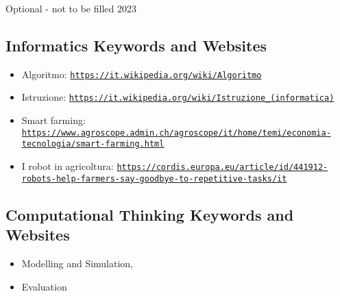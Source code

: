 \documentclass[a4paper,11pt]{report}
\newcommand{\BrochureUrlText}[1]{\texttt{#1}}
\begin{document}
Optional - not to be filled 2023


\subsection*{Informatics Keywords and Websites}

\begin{itemize}
  \item Algoritmo: \href{https://it.wikipedia.org/wiki/Algoritmo}{\BrochureUrlText{https://it.wikipedia.org/wiki/Algoritmo}}
  \item Istruzione: \href{https://it.wikipedia.org/wiki/Istruzione_(informatica)}{\BrochureUrlText{https://it.wikipedia.org/wiki/Istruzione\_(informatica)}}
  \item Smart farming: \href{https://www.agroscope.admin.ch/agroscope/it/home/temi/economia-tecnologia/smart-farming.html}{\BrochureUrlText{https://www.agroscope.admin.ch/agroscope/it/home/temi/economia-tecnologia/smart-farming.html}}
  \item I robot in agricoltura: \href{https://cordis.europa.eu/article/id/441912-robots-help-farmers-say-goodbye-to-repetitive-tasks/it}{\BrochureUrlText{https://cordis.europa.eu/article/id/441912-robots-help-farmers-say-goodbye-to-repetitive-tasks/it}}
\end{itemize}


\subsection*{Computational Thinking Keywords and Websites}

\begin{itemize}
  \item Modelling and Simulation,
  \item Evaluation
\end{itemize}
\end{document}
